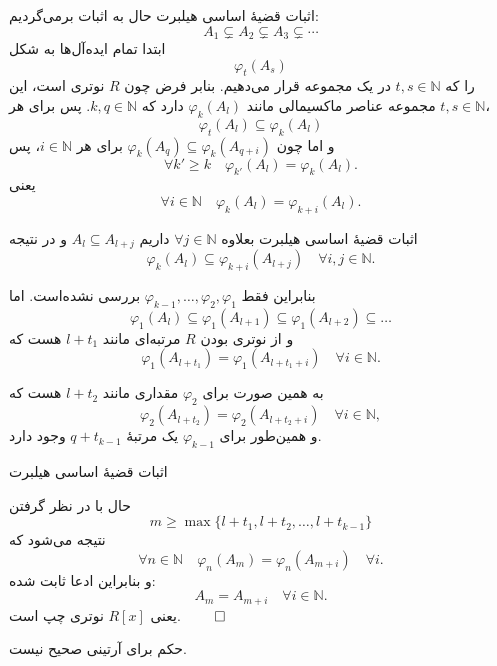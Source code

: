 \begin{frame}{اثبات قضیهٔ اساسی هیلبرت}
    حال به اثبات برمی‌گردیم:
    \[
        A_1 \subsetneq A_2 \subsetneq A_3 \subsetneq \cdots
    \]
    ابتدا تمام ایده‌آل‌ها به شکل
    \[
        \varphi_t(A_s)
    \]
    را که $t,s \in \mathbb{N}$ در یک مجموعه قرار می‌دهیم. بنابر فرض چون $R$ نوتری است، این مجموعه عناصر ماکسیمالی مانند $\varphi_k(A_l)$ دارد که $k,q \in \mathbb{N}$. پس برای هر $t,s \in \mathbb{N}$،
    \[
        \varphi_t(A_l) \subseteq \varphi_k(A_l)
    \]
    و اما چون $\varphi_k(A_q) \subseteq \varphi_k(A_{q+i})$ برای هر $i \in \mathbb{N}$، پس
    \[
        \forall k' \geq k \quad \varphi_{k'}(A_l) = \varphi_k(A_l).
    \]
    یعنی
    \[
        \forall i \in \mathbb{N} \quad \varphi_k(A_l) = \varphi_{k+i}(A_l).
    \]



\end{frame}

\begin{frame}{اثبات قضیهٔ اساسی هیلبرت}
    بعلاوه $\forall j \in \mathbb{N}$ داریم $A_l \subseteq A_{l+j}$ و در نتیجه
    \[
        \varphi_{k}(A_l) \subseteq \varphi_{k+i}(A_{l+j}) \quad \forall i,j \in \mathbb{N}.
    \]

    بنابراین فقط
    $\varphi_{k-1},  \dots, \varphi_2, \varphi_{1}$
    بررسی نشده‌است.
    اما
    \[
        \varphi_1(A_l) \subseteq \varphi_1(A_{l+1}) \subseteq \varphi_1(A_{l+2}) \subseteq \dots
    \]
    و از نوتری بودن $R$ مرتبه‌ای مانند $l+t_1$ هست که
    \[
        \varphi_1(A_{l+t_1}) = \varphi_1(A_{l+t_1+i}) \quad \forall i \in \mathbb{N}.
    \]

    به همین صورت برای $\varphi_2$ مقداری مانند $l+t_2$ هست که
    \[
        \varphi_2(A_{l+t_2}) = \varphi_2(A_{l+t_2+i}) \quad \forall i \in \mathbb{N},
    \]
    و همین‌طور برای $\varphi_{k-1}$ یک مرتبهٔ $q+t_{k-1}$ وجود دارد.

\end{frame}

\begin{frame}{اثبات قضیهٔ اساسی هیلبرت}

    حال با در نظر گرفتن
    \[
        m \geq \max \{  l+t_1, l+t_2, \dots, l+t_{k-1} \}
    \]
    نتیجه می‌شود که
    \[
        \forall n \in \mathbb{N} \quad \varphi_n(A_m) = \varphi_n(A_{m+i}) \quad \forall i.
    \]
    و بنابراین ادعا ثابت شده:
    \[
        A_m = A_{m+i} \quad \forall i \in \mathbb{N}.
    \]
    یعنی $R[x]$ نوتری چپ است. \hfill \(\qed\)
    \begin{remark}
        حکم برای آرتینی صحیح نیست.
    \end{remark}
\end{frame}

